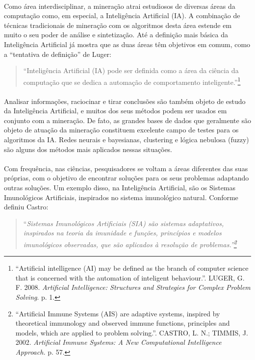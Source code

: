 \documentclass{iiufrgs}
\begin{document}
\paragraph{}Como área interdisciplinar, a mineração atrai estudiosos de diversas áreas da computação como, em especial, a Inteligência Artificial (IA). A combinação de técnicas tradicionais de mineração com os algoritmos desta área estende em muito o seu poder de análise e sintetização. Até a definição mais básica da Inteligência Artificial já mostra que as duas áreas têm objetivos em comum, como a ``tentativa de definição'' de Luger:

\begin{quote}
``Inteligência Artificial (IA) pode ser definida como a área da ciência da computação que se dedica a automação de comportamento inteligente.''\footnote{``Artificial intelligence (AI) may be defined as the branch of computer science that is concerned with the automation of inteligent behaviour.''. LUGER, G. F. 2008. \emph{Artificial Intelligence: Structures and Strategies for Complex Problem Solving}. p. 1.}
\end{quote}

\paragraph{}Analisar informações, raciocinar e tirar conclusões são também objeto de estudo da Inteligência Artificial, e muitos dos seus métodos podem ser usados em conjunto com a mineração. De fato, as grandes bases de dados que geralmente são objeto de atuação da mineração constituem excelente campo de testes para os algoritmos da IA. Redes neurais e bayesianas, clustering e lógica nebulosa (fuzzy) são alguns dos métodos mais aplicados nessas situações.

\paragraph{}Com frequência, nas ciências, pesquisadores se voltam a áreas diferentes das suas próprias, com o objetivo de encontrar soluções para os seus problemas adaptando outras soluções. Um exemplo disso, na Inteligência Artificial, são os Sistemas Imunológicos Artificiais, inspirados no sistema imunológico natural. Conforme definiu Castro:

\begin{quote}
``\emph{Sistemas Imunológicos Artificiais (SIA) são sistemas adaptativos, inspirados na teoria da imunidade e funções, princípios e modelos imunológicos observadas, que são aplicados à resolução de problemas.''\footnote{``Artificial Immune Systems (AIS) are adaptive systems, inspired by theoretical immunology and observed immune functions, principles and models, which are applied to problem solving.''. CASTRO, L. N.; TIMMIS, J. 2002. \emph{Artificial Immune Systems: A New Computational Intelligence Approach.} p. 57.}}
\end{quote}
\end{document}
